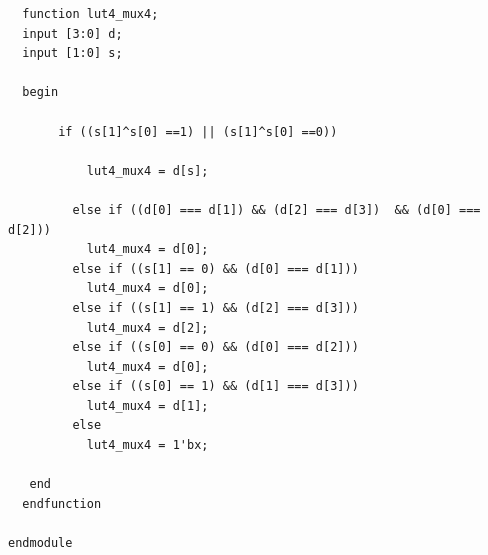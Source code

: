 \documentclass[a4paper,openright,12pt]{report}
\begin{document}
\begin{lstlisting}
  function lut4_mux4;
  input [3:0] d;
  input [1:0] s;
   
  begin

       if ((s[1]^s[0] ==1) || (s[1]^s[0] ==0))

           lut4_mux4 = d[s];

         else if ((d[0] === d[1]) && (d[2] === d[3])  && (d[0] === d[2]))
           lut4_mux4 = d[0];
         else if ((s[1] == 0) && (d[0] === d[1]))
           lut4_mux4 = d[0];
         else if ((s[1] == 1) && (d[2] === d[3]))
           lut4_mux4 = d[2];
         else if ((s[0] == 0) && (d[0] === d[2]))
           lut4_mux4 = d[0];
         else if ((s[0] == 1) && (d[1] === d[3]))
           lut4_mux4 = d[1];
         else
           lut4_mux4 = 1'bx;

   end
  endfunction

endmodule

\end{lstlisting}
\end{document}
